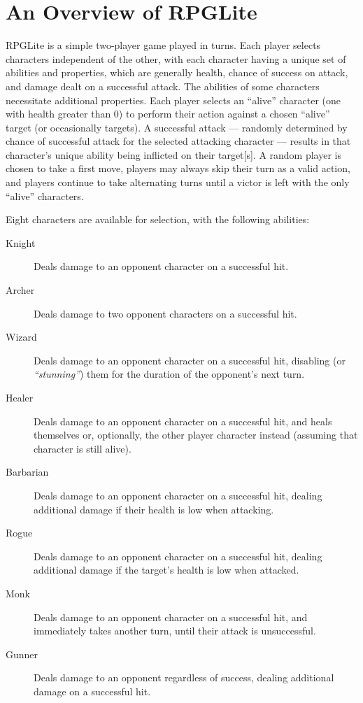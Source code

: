 
\section{An Overview of RPGLite}

RPGLite is a simple two-player game played in turns. Each player selects
characters independent of the other, with each character having a unique set of
abilities and properties, which are generally health, chance of success on
attack, and damage dealt on a successful attack. The abilities of some
characters necessitate additional properties. Each player selects an ``alive''
character (one with health greater than 0) to perform their action against a
chosen ``alive'' target (or occasionally targets). A successful attack ---
randomly determined by chance of successful attack for the selected attacking
character --- results in that character's unique ability being inflicted on
their target[s]. A random player is chosen to take a first move, players may
always skip their turn as a valid action, and players continue to take
alternating turns until a victor is left with the only ``alive'' characters.

Eight characters are available for selection, with the following abilities:

\begin{description} \item[Knight] Deals damage to an opponent character on a
successful hit.  \item[Archer] Deals damage to two opponent characters on a
successful hit.  \item[Wizard] Deals damage to an opponent character on a
successful hit, disabling (or \emph{``stunning''}) them for the duration of the
opponent's next turn.  \item[Healer] Deals damage to an opponent character on a
successful hit, and heals themselves or, optionally, the other player character
instead (assuming that character is still alive).  \item[Barbarian] Deals damage
to an opponent character on a successful hit, dealing additional damage if their
health is low when attacking.  \item[Rogue] Deals damage to an opponent
character on a successful hit, dealing additional damage if the target's health
is low when attacked.  \item[Monk] Deals damage to an opponent character on a
successful hit, and immediately takes another turn, until their attack is
unsuccessful.  \item[Gunner] Deals damage to an opponent regardless of success,
dealing additional damage on a successful hit.  \end{description}

